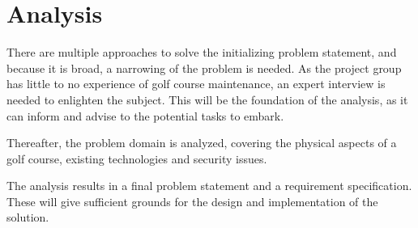 
\chapter{Analysis}
There are multiple approaches to solve the initializing problem statement, and because it is broad, a narrowing of the problem is needed. As the project group has little to no experience of golf course maintenance, an expert interview is needed to enlighten the subject. This will be the foundation of the analysis, as it can inform and advise to the potential tasks to embark.

Thereafter, the problem domain is analyzed, covering the physical aspects of a golf course, existing technologies and security issues. 

The analysis results in a final problem statement and a requirement specification. These will give sufficient grounds for the design and implementation of the solution.


% 





